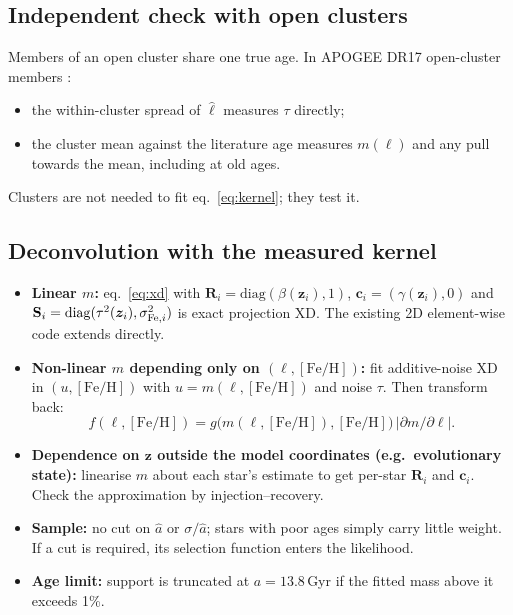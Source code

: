 \documentclass[11pt,a4paper]{article}
\newcommand{\feh}{\ensuremath{[\mathrm{Fe/H}]}}
\begin{document}
\subsection{Independent check with open clusters}
Members of an open cluster share one true age. In APOGEE DR17 open-cluster members \citep{Myers2022}:
\begin{itemize}
  \item the within-cluster spread of $\hat\ell$ measures $\tau$ directly;
  \item the cluster mean against the literature age measures $m(\ell)$ and any pull towards the mean, including at old ages.
\end{itemize}
Clusters are not needed to fit eq.~\eqref{eq:kernel}; they test it.

\subsection{Deconvolution with the measured kernel}
\begin{itemize}
  \item \textbf{Linear $m$:} eq.~\eqref{eq:xd} with $\mathbf R_i=\mathrm{diag}(\beta(\bm z_i),1)$, $\bm c_i=(\gamma(\bm z_i),0)$ and $\mathbf S_i=\mathrm{diag}(\tau^2(\bm z_i),\sigma^2_{{\rm Fe},i})$ is exact projection XD. The existing 2D element-wise code extends directly.
  \item \textbf{Non-linear $m$ depending only on $(\ell,\feh)$:} fit additive-noise XD in $(u,\feh)$ with $u=m(\ell,\feh)$ and noise $\tau$. Then transform back:
    \[f(\ell,\feh)=g\big(m(\ell,\feh),\feh\big)\,|\partial m/\partial\ell| .\]
  \item \textbf{Dependence on $\bm z$ outside the model coordinates (e.g.\ evolutionary state):} linearise $m$ about each star's estimate to get per-star $\mathbf R_i$ and $\bm c_i$. Check the approximation by injection--recovery.
  \item \textbf{Sample:} no cut on $\hat a$ or $\sigma/\hat a$; stars with poor ages simply carry little weight. If a cut is required, its selection function enters the likelihood.
  \item \textbf{Age limit:} support is truncated at $a=13.8$\,Gyr if the fitted mass above it exceeds 1\%.
\end{itemize}
\end{document}
